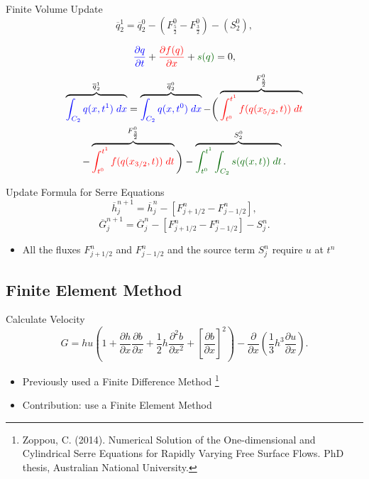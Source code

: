 \documentclass[]{beamer}
\begin{document}
\begin{frame}{Finite Volume Update}	
	\begin{equation*}
	\overline{q}^1_2 = \overline{q}^0_2 - \left(F^0_{\frac{5}{2}} - F^0_{\frac{3}{2}}\right) - \left(S^0_2\right),
	\end{equation*}	
	
	\begin{equation*}
	{\color{blue}\frac{\partial q}{\partial t}} + {\color{red}\frac{\partial f(q)}{\partial x} } + {\color{green!40!black} s(q) } = 0,
	\end{equation*}	
	\pause
	\begin{multline*}
	\overbrace{ {\color{blue}\int_{C_2} q(x,t^1) \; dx}}^{\overline{q}^1_2} = \overbrace{ {\color{blue}\int_{C_2} q(x,t^0) \; dx } }^{\overline{q}^0_2} -  \bigg( \overbrace{ {\color{red}\int_{t^0}^{t^1} f(q(x_{5/2},t)) \; dt}}^{F^0_{\frac{5}{2}}} \\- \overbrace{{\color{red}\int_{t^0}^{t^1} f(q(x_{3/2},t)) \; dt}}^{F^0_{\frac{3}{2}}}  \bigg) -  \overbrace{ {\color{green!40!black}\int_{t^0}^{t^1} \int_{C_2} s(q(x,t)) \; dt }}^{S^0_{2}}.
	\end{multline*}
\end{frame}



\begin{frame}{Update Formula for Serre Equations}
	\begin{equation*}
	\overline{h}_j^{n+1} = \overline{h}_j^n -  \left[F_{j + 1/2}^n - F_{j - 1/2}^n \right],
	\end{equation*}
	\begin{equation*}
	\overline{G}_j^{n+1}  = \overline{G}_j^n -  \left[F_{j + 1/2}^n - F_{j - 1/2}^n \right] -  S^n_j.
	\end{equation*}
	\pause
	\begin{itemize}
		\item All the fluxes $F^n_{j + 1/2}$ and $F^n_{j - 1/2}$ and the source term $ S^n_j$ require $u$ at $t^n$
	\end{itemize}
	
\end{frame}

\subsection{Finite Element Method}
\begin{frame}{Calculate Velocity}
		\[ G =  h {u} \left(1 + \frac{\partial h}{\partial x}\frac{\partial b}{\partial x} + \frac{1}{2}h\frac{\partial^2 b}{\partial x^2} + \left[\frac{\partial b}{\partial x}\right]^2 \right) - \frac{\partial}{\partial x}\left(\frac{1}{3}h^3  \frac{\partial {u}}{\partial x}\right).\]
		\pause
		\begin{itemize}
			\item Previously used a Finite Difference Method \footnote{Zoppou, C. (2014).
				Numerical Solution of the One-dimensional and Cylindrical
				Serre Equations for Rapidly Varying Free Surface Flows. PhD thesis, Australian National University.}
			\item Contribution: use a Finite Element Method
		\end{itemize}
\end{frame}
\end{document}
